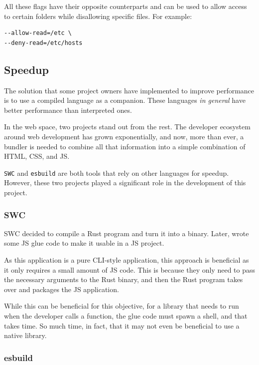 \documentclass[12pt, letterpaper]{article}
\begin{document}
\begin{multicols}{2}
    All these flags have their opposite counterparts and can be used to allow access to certain folders while disallowing specific files. For example:

    \begin{lstlisting}
--allow-read=/etc \
--deny-read=/etc/hosts
    \end{lstlisting}

    \subsection{Speedup}

    The solution that some project owners have implemented to improve performance is to use a compiled language as a companion. These languages \textit{in general} have better performance than interpreted ones.

    In the web space, two projects stand out from the rest. The developer ecosystem around web development has grown exponentially, and now, more than ever, a bundler \cite{Bundler} is needed to combine all that information into a simple combination of HTML, CSS, and JS.

    \verb|SWC| and \verb|esbuild| are both tools that rely on other languages for speedup. However, these two projects played a significant role in the development of this project.

    \subsubsection{SWC}

    SWC decided to compile a Rust program and turn it into a binary. Later, wrote some JS glue code to make it usable in a JS project.

    As this application is a pure CLI-style application, this approach is beneficial as it only requires a small amount of JS code. This is because they only need to pass the necessary arguments to the Rust binary, and then the Rust program takes over and packages the JS application.

    While this can be beneficial for this objective, for a library that needs to run when the developer calls a function, the glue code must spawn a shell, and that takes time. So much time, in fact, that it may not even be beneficial to use a native library.

    \subsubsection{esbuild}


\end{multicols}
\end{document}
